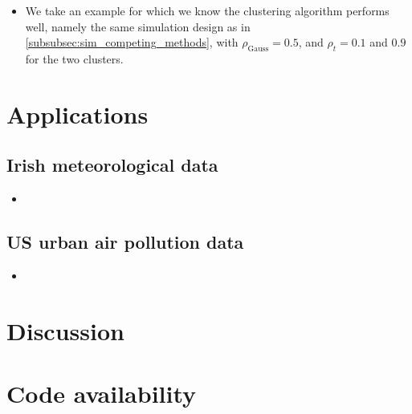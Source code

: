 \documentclass{article}
\numberwithin{equation}{section}
\begin{document}
\begin{itemize}
  \item We take an example for which we know the clustering algorithm performs well, namely the same simulation design as in \ref{subsubsec:sim_competing_methods}, with $\rho_{\text{Gauss}} = 0.5$, and $\rho_{t} = 0.1$ and $0.9$ for the two clusters.
\end{itemize}

\section{Applications}
\subsection{Irish meteorological data} \label{subsec:app_irl}

\begin{itemize}
    \item 
\end{itemize}

\subsection{US urban air pollution data} \label{subsec:app_us}

\begin{itemize}
    \item 
\end{itemize}

\section{Discussion}

\section*{Code availability}

\newpage

\end{document}
